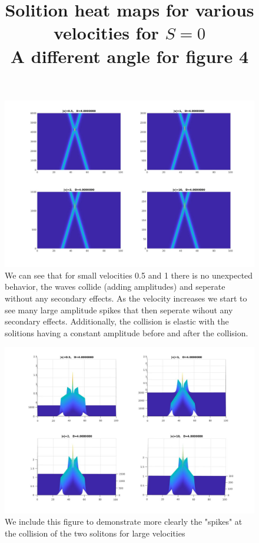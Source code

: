 \documentclass{article}
\begin{document}
\begin{enumerate}
\begin{figure}[htp]
\title{Solition heat maps for various velocities for $S=0$\\}
\centering
\includegraphics[scale=0.35,center]{3D_V_S0.jpg}
\caption{We can see that for small velocities 0.5 and 1 there is no unexpected behavior, the waves collide (adding amplitudes) and seperate without any secondary effects. As the velocity increases we start to see many large amplitude spikes that then seperate wihout any secondary effects. Additionally, the collision is elastic with the solitions having a constant amplitude before and after the collision.}
\end{figure}
\pagebreak
\begin{figure}[htp]
\title{A different angle for figure 4\\}
\includegraphics[scale=0.3,center]{3D2_V_S0.jpg}
\caption{We include this figure to demonstrate more clearly the "spikes" at the collision of the two solitons for large velocities}
\end{figure}


\end{enumerate}
\end{document}
